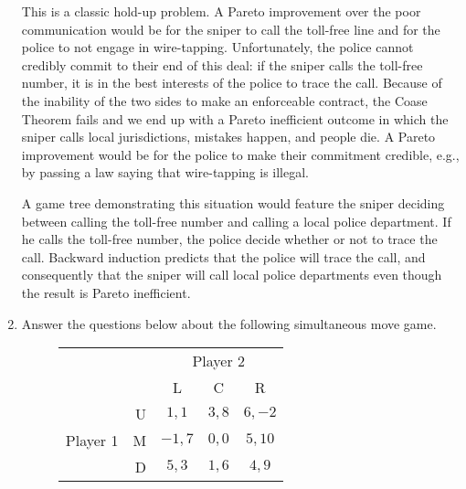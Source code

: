 \documentclass[twoside]{article}
\begin{document}
\begin{enumerate}
\begin{EXAM}
\clearpage
\end{EXAM}

\begin{KEY}
This is a classic hold-up problem. A Pareto improvement over the poor communication would be for the sniper to call the toll-free line and for the police to not engage in wire-tapping. Unfortunately, the police cannot credibly commit to their end of this deal: if the sniper calls the toll-free number, it is in the best interests of the police to trace the call. Because of the inability of the two sides to make an enforceable contract, the Coase Theorem fails and we end up with a Pareto inefficient outcome in which the sniper calls local jurisdictions, mistakes happen, and people die. A Pareto improvement would be for the police to make their commitment credible, e.g., by passing a law saying that wire-tapping is illegal.

A game tree demonstrating this situation would feature the sniper deciding between calling the toll-free number and calling a local police department. If he calls the toll-free number, the police decide whether or not to trace the call. Backward induction predicts that the police will trace the call, and consequently that the sniper will call local police departments even though the result is Pareto inefficient.
\end{KEY}

\item Answer the questions below about the following simultaneous move game.

    \begin{figure}[h]
    \begin{center}
    \begin{tabular}{crccc}
    & & \multicolumn{3}{c}{Player 2} \\ [.15cm]
    & & L & C & R \\ \cline{3-5}
    \multirow{3}{1.5cm}{Player 1} 
    & U & \multicolumn{1}{|c|}{$1,1$} & \multicolumn{1}{c}{$3,8$} & \multicolumn{1}{|c|}{$6,-2$} \\ \cline{3-5}
    & M & \multicolumn{1}{|c|}{$-1,7$} & \multicolumn{1}{c}{$0,0$} & \multicolumn{1}{|c|}{$5,10$} \\ \cline{3-5}
    & D & \multicolumn{1}{|c|}{$5,3$} & \multicolumn{1}{c}{$1,6$} & \multicolumn{1}{|c|}{$4,9$} \\ \cline{3-5}
    \end{tabular}
    \end{center}
    \end{figure}



\end{enumerate}
\end{document}
